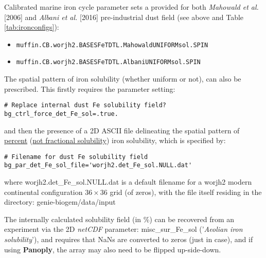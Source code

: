 \documentclass[11pt,fleqn]{book} %
\begin{document}
\pagebreak
 
Calibrated marine iron cycle parameter sets a provided for both \textit{Mahowald et al.} [2006] and \textit{Albani et al.} [2016] pre-industrial dust field (see above and Table \ref{tab:ironconfigs}):
\begin{itemize}[noitemsep]
\vspace{1mm}
\item \texttt{muffin.CB.worjh2.BASESFeTDTL.MahowaldUNIFORMsol.SPIN}
\vspace{1mm}
\item \texttt{muffin.CB.worjh2.BASESFeTDTL.AlbaniUNIFORMsol.SPIN}
\end{itemize}

\vspace{2mm}
\noindent The spatial pattern of iron solubility (whether uniform or not), can also be prescribed. This firstly requires the parameter setting:
\small\vspace{-2pt}\begin{verbatim}
# Replace internal dust Fe solubility field?
bg_ctrl_force_det_Fe_sol=.true.
\end{verbatim}\vspace{-2pt}\normalsize
and then the presence of a 2D ASCII file delineating the spatial pattern of \uline{percent} (\uline{not fractional solubility}) iron solubility, which is specified by:
\small\vspace{-2pt}\begin{verbatim}
# Filename for dust Fe solubility field
bg_par_det_Fe_sol_file='worjh2.det_Fe_sol.NULL.dat'
\end{verbatim}\vspace{-2pt}\normalsize
where \textsf{\footnotesize worjh2.det\_Fe\_sol.NULL.dat} is a default filename for a \textsf{\footnotesize worjh2} modern continental configuration \(36\times36\) grid (of zeros), with the file itself residing in the directory: \textsf{\footnotesize genie-biogem/data/input}

The internally calculated solubility field (in \%) can be recovered from an experiment via the 2D \textit{netCDF} parameter: \textsf{\footnotesize misc\_sur\_Fe\_sol} (\textsf{\footnotesize '\textit{Aeolian iron solubility}'}), and requires that NaNs are converted to zeros (just in case), and if using \textbf{Panoply}, the array may also need to be flipped up-side-down.
\end{document}

